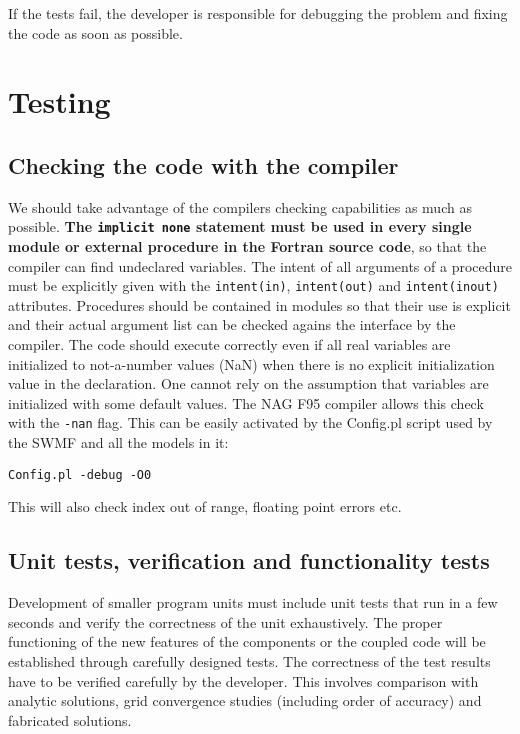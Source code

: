 \documentclass{article}
\begin{document}
If the tests fail, the developer is responsible for debugging the problem
and fixing the code as soon as possible. 

\section{Testing}

\subsection{Checking the code with the compiler}

We should take advantage of the compilers checking capabilities 
as much as possible.
{\bf The {\tt implicit none} statement must be used in every single 
module or external procedure in the Fortran source code}, so that the
compiler can find undeclared variables. The intent of all arguments 
of a procedure must be explicitly given with the {\tt intent(in)}, 
{\tt intent(out)} and {\tt intent(inout)} attributes. Procedures should
be contained in modules so that their use is explicit and their actual
argument list can be checked agains the interface by the compiler. 
The code should execute correctly even if all real variables are 
initialized to not-a-number values (NaN)
when there is no explicit initialization value in the declaration.
One cannot rely on the assumption that variables are initialized with
some default values. The NAG F95 compiler allows this check with the 
{\tt -nan} flag. This can be easily activated by the Config.pl script
used by the SWMF and all the models in it:
\begin{verbatim}
Config.pl -debug -O0
\end{verbatim}
This will also check index out of range, floating point errors etc.

\subsection{Unit tests, verification and functionality tests}

Development of smaller program units must include unit tests that 
run in a few seconds and verify the correctness of the unit
exhaustively. 
The proper functioning of the new features of the components or
the coupled code will be established through carefully designed tests.
The correctness of the test results have to be verified 
carefully by the developer. This involves comparison with analytic 
solutions, grid convergence studies (including order of accuracy) 
and fabricated solutions.
\end{document}
